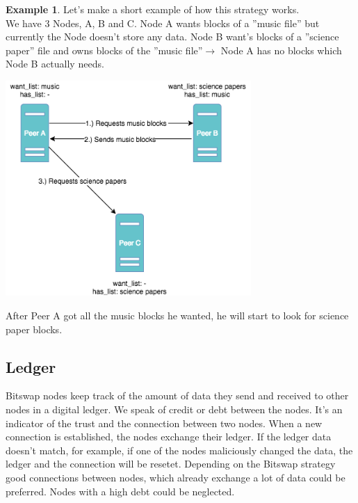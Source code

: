 \documentclass[a4paper,11pt, oneside]{report}
\theoremstyle{definition}
\newtheorem{exmp}{Example}[subsection]
\begin{document}
\newpage
\begin{exmp}
Let's make a short example of how this strategy works.\\ 
We have 3 Nodes, A, B and C. Node A wants blocks of a ''music file'' but currently the Node doesn't store any data. Node B want's blocks of a ''science paper'' file and owns blocks of the ''music file''$\rightarrow$ Node A has no blocks which Node B actually needs.
\begin{center}
\includegraphics[width=0.7\textwidth]{img/ipfs_bitswap_noblocks.png}\\[0.3cm] 
\end{center}
After Peer A got all the music blocks he wanted, he will start to look for science paper blocks.
\end{exmp}

\subsection{Ledger}
Bitswap nodes keep track of the amount of data they send and received to other nodes in a digital ledger. We speak of credit or debt between the nodes. It's an indicator of the trust and the connection between two nodes. When a new connection is established, the nodes exchange their ledger. If the ledger data doesn't match, for example, if one of the nodes maliciously changed the data, the ledger and the connection will be resetet. Depending on the Bitswap strategy good connections between nodes, which already exchange a lot of data could be preferred. Nodes with a high debt could be neglected.

\newpage
\end{document}
